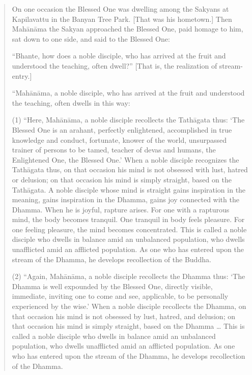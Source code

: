 \begin{quotation}
On one occasion the Blessed One was dwelling among the Sakyans at
Kapilavattu in the Banyan Tree Park. {[}That was his hometown.{]} Then
Mahānāma the Sakyan approached the Blessed One, paid homage to him, sat
down to one side, and said to the Blessed One:

“Bhante, how does a noble disciple, who has arrived at the fruit and
understood the teaching, often dwell?” {[}That is, the realization of
stream-entry.{]}

“Mahānāma, a noble disciple, who has arrived at the fruit and understood
the teaching, often dwells in this way:

(1) “Here, Mahānāma, a noble disciple recollects the Tathāgata thus:
‘The Blessed One is an arahant, perfectly enlightened, accomplished in
true knowledge and conduct, fortunate, knower of the world, unsurpassed
trainer of persons to be tamed, teacher of devas and humans, the
Enlightened One, the Blessed One.’ When a noble disciple recognizes the
Tathāgata thus, on that occasion his mind is not obsessed with lust,
hatred or delusion; on that occasion his mind is simply straight, based
on the Tathāgata. A noble disciple whose mind is straight gains
inspiration in the meaning, gains inspiration in the Dhamma, gains joy
connected with the Dhamma. When he is joyful, rapture arises. For one
with a rapturous mind, the body becomes tranquil. One tranquil in body
feels pleasure. For one feeling pleasure, the mind becomes concentrated.
This is called a noble disciple who dwells in balance amid an unbalanced
population, who dwells unafflicted amid an afflicted population. As one
who has entered upon the stream of the Dhamma, he develops recollection
of the Buddha.

(2) “Again, Mahānāma, a noble disciple recollects the Dhamma thus: ‘The
Dhamma is well expounded by the Blessed One, directly visible,
immediate, inviting one to come and see, applicable, to be personally
experienced by the wise.’ When a noble disciple recollects the Dhamma,
on that occasion his mind is not obsessed by lust, hatred, and delusion;
on that occasion his mind is simply straight, based on the Dhamma \ldots{}
This is called a noble disciple who dwells in balance amid an unbalanced
population, who dwells unafflicted amid an afflicted population. As one
who has entered upon the stream of the Dhamma, he develops recollection
of the Dhamma.


\end{quotation}
